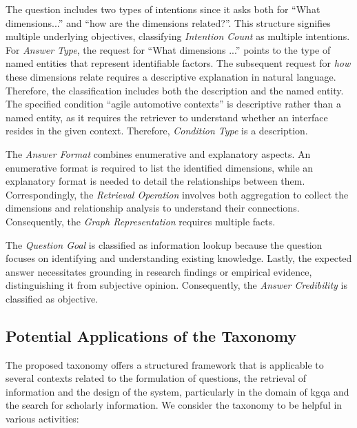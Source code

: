 The question includes two types of intentions since it asks both for \enquote{What dimensions...} and \enquote{how are the dimensions related?}. This structure signifies multiple underlying objectives, classifying \emph{Intention Count} as multiple intentions. For \emph{Answer Type}, the request for \enquote{What dimensions ...} points to the type of named entities that represent identifiable factors. The subsequent request for \emph{how} these dimensions relate requires a descriptive explanation in natural language. Therefore, the classification includes both the description and the named entity. The specified condition \enquote{agile automotive contexts} is descriptive rather than a named entity, as it requires the retriever to understand whether an interface resides in the given context. Therefore, \emph{Condition Type} is a description.

The \emph{Answer Format} combines enumerative and explanatory aspects. An enumerative format is required to list the identified dimensions, while an explanatory format is needed to detail the relationships between them. Correspondingly, the \emph{Retrieval Operation} involves both aggregation to collect the dimensions and relationship analysis to understand their connections. Consequently, the \emph{Graph Representation} requires multiple facts.

The \emph{Question Goal} is classified as information lookup because the question focuses on identifying and understanding existing knowledge. Lastly, the expected answer necessitates grounding in research findings or empirical evidence, distinguishing it from subjective opinion. Consequently, the \emph{Answer Credibility} is classified as objective.



\subsection{Potential Applications of the Taxonomy}
\label{sec:where_to_apply_the_taxonomy}

The proposed taxonomy offers a structured framework that is applicable to several contexts related to the formulation of questions, the retrieval of information and the design of the system, particularly in the domain of \gls{kgqa} and the search for scholarly information. We consider the taxonomy to be helpful in various activities:

